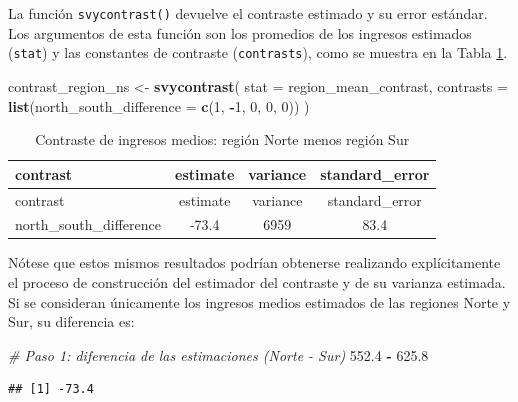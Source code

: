 \documentclass[
  spanish,
  12pt,
]{book}
\newenvironment{Shaded}{\begin{snugshade}}{\end{snugshade}}
\newcommand{\AttributeTok}[1]{\textcolor[rgb]{0.13,0.29,0.53}{#1}}
\newcommand{\CommentTok}[1]{\textcolor[rgb]{0.56,0.35,0.01}{\textit{#1}}}
\newcommand{\DecValTok}[1]{\textcolor[rgb]{0.00,0.00,0.81}{#1}}
\newcommand{\FloatTok}[1]{\textcolor[rgb]{0.00,0.00,0.81}{#1}}
\newcommand{\FunctionTok}[1]{\textcolor[rgb]{0.13,0.29,0.53}{\textbf{#1}}}
\newcommand{\NormalTok}[1]{#1}
\newcommand{\OtherTok}[1]{\textcolor[rgb]{0.56,0.35,0.01}{#1}}
\newcommand{\SpecialCharTok}[1]{\textcolor[rgb]{0.81,0.36,0.00}{\textbf{#1}}}
\begin{document}
La función \texttt{svycontrast()} devuelve el contraste estimado y su error estándar. Los argumentos de esta función son los promedios de los ingresos estimados (\texttt{stat}) y las constantes de contraste (\texttt{contrasts}), como se muestra en la Tabla \ref{tab:tab-contraste-ns}.

\begin{Shaded}
\begin{Highlighting}[]
\NormalTok{contrast\_region\_ns }\OtherTok{\textless{}{-}} \FunctionTok{svycontrast}\NormalTok{(}
  \AttributeTok{stat =}\NormalTok{ region\_mean\_contrast,}
  \AttributeTok{contrasts =} \FunctionTok{list}\NormalTok{(}\AttributeTok{north\_south\_difference =} \FunctionTok{c}\NormalTok{(}\DecValTok{1}\NormalTok{, }\SpecialCharTok{{-}}\DecValTok{1}\NormalTok{, }\DecValTok{0}\NormalTok{, }\DecValTok{0}\NormalTok{, }\DecValTok{0}\NormalTok{))}
\NormalTok{)}
\end{Highlighting}
\end{Shaded}

\begin{longtable}[]{@{}lccc@{}}
\caption{\label{tab:tab-contraste-ns}Contraste de ingresos medios: región Norte menos región Sur}\tabularnewline
\toprule\noalign{}
contrast & estimate & variance & standard\_error \\
\midrule\noalign{}
\endfirsthead
\toprule\noalign{}
contrast & estimate & variance & standard\_error \\
\midrule\noalign{}
\endhead
\bottomrule\noalign{}
\endlastfoot
north\_south\_difference & -73.4 & 6959 & 83.4 \\
\end{longtable}

Nótese que estos mismos resultados podrían obtenerse realizando explícitamente el proceso de construcción del estimador del contraste y de su varianza estimada. Si se consideran únicamente los ingresos medios estimados de las regiones Norte y Sur, su diferencia es:

\begin{Shaded}
\begin{Highlighting}[]
\CommentTok{\# Paso 1: diferencia de las estimaciones (Norte {-} Sur)}
\FloatTok{552.4} \SpecialCharTok{{-}} \FloatTok{625.8}
\end{Highlighting}
\end{Shaded}

\begin{verbatim}
## [1] -73.4
\end{verbatim}
\end{document}
